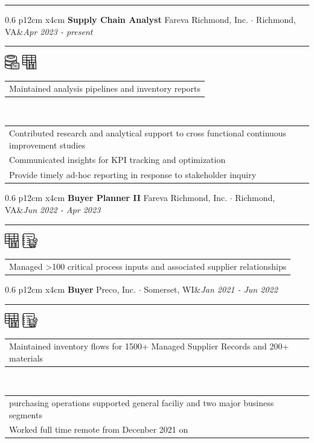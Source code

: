 \documentclass[10pt,A4]{article}
\newcommand{\tzlarrow}{(0,0) -- (0.2,0) -- (0.3,0.2) -- (0.2,0.4) -- (0,0.4) -- (0.1,0.2) -- cycle;}
\newcommand{\larrow}[1]
{\begin{tikzpicture}[scale=0.58]
	 \filldraw[fill=#1!100,draw=#1!100!black]  \tzlarrow
 \end{tikzpicture}
}
\newcommand{\cvevent}[5]
{
\vspace{8pt}
	\begin{tabular*}{0.6\linewidth}{ p{12cm} x{4cm}}
\textbf{#2} \hspace{4pt} {#3}&\textit{#1}\\[4pt]
	\end{tabular*}
        
        \vspace{-3pt}

\textcolor{softcol}{\hrule}
\vspace{-2pt}
\hspace{14.3cm}
#4 \\[-18pt-6pt]
\vspace{6pt}
	\begin{tabular*}{1\textwidth}{l}
	\vspace{-0.85cm} \larrow{sectcol} #5\\[4.5pt]
	\end{tabular*}
}
\newcommand{\cveventshort}[5]
{
\vspace{8pt}
	\begin{tabular*}{0.6\linewidth}{ p{12cm} x{4cm}}
\textbf{#2} \hspace{4pt} {#3}&\textit{#1}\\[4pt]
	\end{tabular*}
        
        \vspace{-3pt}
        
\textcolor{softcol}{\hrule}
\vspace{-2pt}
\hspace{14.3cm}
#4 \\[-18pt-6pt]
\vspace{6pt}
	\begin{tabular*}{1\textwidth}{l}
	\vspace{-0.85cm} \larrow{sectcol} #5\\[6pt]
	\end{tabular*}
\vspace{-3pt}
}
\newcommand{\oneextra}[1]
{ \vspace{-0.85cm+24pt} \\
\begin{tabular*}{1\textwidth}{l}
		 \larrow{softcol}  #1\\[6pt]
	\end{tabular*}
\vspace{-3pt}
}
\newcommand{\twoextra}[2]
{ \vspace{-0.85cm+24pt} \\
\begin{tabular*}{1\textwidth}{l}
		 \larrow{softcol}  #1\\[4.5pt]
		 \larrow{softcol}  #2\\[6pt]
	\end{tabular*}
\vspace{-3pt}
}
\newcommand{\threeextra}[3]
{ \vspace{-0.85cm+24pt} \\
\begin{tabular*}{1\textwidth}{l}
		 \larrow{softcol}  #1\\[4.5pt]
		 \larrow{softcol}  #2\\[4.5pt]
		 \larrow{softcol}  #3\\[6pt]
	\end{tabular*}
\vspace{-3pt}
}
\begin{document}
\begin{minipage}[c][0.5\textheight][t]{\linewidth}
\vspace{3.3cm}
  \hspace{18.5cm}
\textcolor{sectcol}{\rule[-3.4cm]{2pt}{7.2cm}}
\hspace{12pt}

\vspace{-9.8cm}
\hspace{26pt}
\parbox[c]{0.8\linewidth}{
%
  \cvevent{Apr 2023 - present}{Supply Chain Analyst}{Fareva Richmond, Inc.  $\cdot$  Richmond, VA}
   {\hspace{22.2222pt}\includegraphics[height=18pt]{img/DBgraphic} \hspace{2pt} \includegraphics[height=18pt]{img/chartgraphic}}
{Maintained analysis pipelines and inventory reports}
\threeextra{Contributed research and analytical support to cross functional continuous improvement studies}{Communicated insights for KPI tracking and optimization}{Provide timely ad-hoc reporting in response to stakeholder inquiry}


%
  \cveventshort{Jun 2022 - Apr 2023}{Buyer Planner II}{Fareva Richmond, Inc.  $\cdot$  Richmond, VA}
{ \hspace{20.2222pt} \includegraphics[height=18pt]{img/chartgraphic} \hspace{2pt} \includegraphics[height=18pt]{img/notebookgraphic}}
{Managed >100 critical process inputs and associated supplier relationships}



%
  \cvevent{Jan 2021 - Jun 2022}{Buyer}{Preco, Inc.  $\cdot$  Somerset, WI}
{ \hspace{20.2222pt} \includegraphics[height=18pt]{img/chartgraphic} \hspace{2pt} \includegraphics[height=18pt]{img/notebookgraphic}}
{Maintained inventory flows for 1500+ Managed Supplier Records and 200+ materials}
  \twoextra{purchasing operations supported general faciliy and two major business segments}{Worked full time remote from Decenber 2021 on}

}
\end{minipage}
\end{document}
